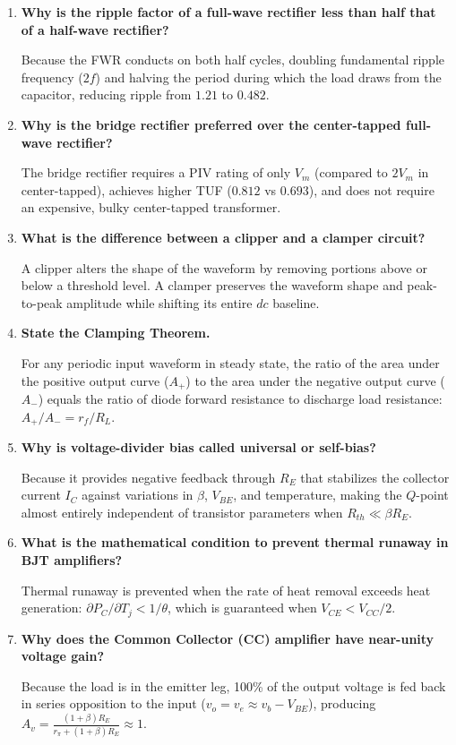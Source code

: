 \documentclass[12pt,a4paper]{article}
\newcommand{\Q}[1]{\textbf{#1}\par\noindent\ignorespaces}
\begin{document}
\begin{tcolorbox}[exambox, title={Frequently Asked / Viva Questions}]
\begin{enumerate}[topsep=0pt, label=\textbf{Q\arabic*.}, itemsep=5pt]
  \item \Q{Why is the ripple factor of a full-wave rectifier less than half that of a half-wave rectifier?}
  Because the FWR conducts on both half cycles, doubling fundamental ripple frequency ($2f$) and halving the period during which the load draws from the capacitor, reducing ripple from $1.21$ to $0.482$.

  \item \Q{Why is the bridge rectifier preferred over the center-tapped full-wave rectifier?}
  The bridge rectifier requires a PIV rating of only $V_m$ (compared to $2V_m$ in center-tapped), achieves higher TUF ($0.812$ vs $0.693$), and does not require an expensive, bulky center-tapped transformer.

  \item \Q{What is the difference between a clipper and a clamper circuit?}
  A clipper alters the shape of the waveform by removing portions above or below a threshold level. A clamper preserves the waveform shape and peak-to-peak amplitude while shifting its entire $dc$ baseline.

  \item \Q{State the Clamping Theorem.}
  For any periodic input waveform in steady state, the ratio of the area under the positive output curve ($A_+$) to the area under the negative output curve ($A_-$) equals the ratio of diode forward resistance to discharge load resistance: $A_+/A_- = r_f/R_L$.

  \item \Q{Why is voltage-divider bias called universal or self-bias?}
  Because it provides negative feedback through $R_E$ that stabilizes the collector current $I_C$ against variations in $\beta$, $V_{BE}$, and temperature, making the $Q$-point almost entirely independent of transistor parameters when $R_{th} \ll \beta R_E$.

  \item \Q{What is the mathematical condition to prevent thermal runaway in BJT amplifiers?}
  Thermal runaway is prevented when the rate of heat removal exceeds heat generation: $\partial P_C/\partial T_j < 1/\theta$, which is guaranteed when $V_{CE} < V_{CC}/2$.

  \item \Q{Why does the Common Collector (CC) amplifier have near-unity voltage gain?}
  Because the load is in the emitter leg, 100\% of the output voltage is fed back in series opposition to the input ($v_o = v_e \approx v_b - V_{BE}$), producing $A_v = \frac{(1+\beta)R_E}{r_\pi + (1+\beta)R_E} \approx 1$.


\end{enumerate}
\end{tcolorbox}
\end{document}
